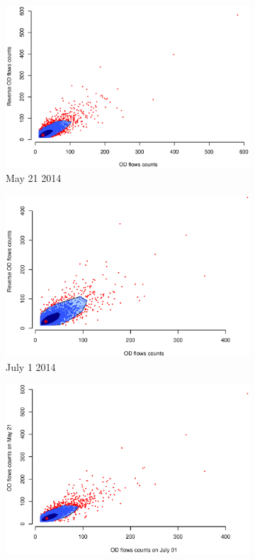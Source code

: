 \documentclass[a4paper,UKenglish]{lipics-v2016}
\begin{document}
\begin{figure}
	\centering
	\begin{subfigure}[b]{0.49\textwidth}
		\includegraphics[width=\textwidth]{images/OD_0521.eps}
		\caption{May 21 2014}
		\label{fig:OD_0521}
	\end{subfigure}
	\hfill %
	\begin{subfigure}[b]{0.49\textwidth}
		\includegraphics[width=\textwidth]{images/OD_0701.eps}
		\caption{July 1 2014}
		\label{fig:OD_0721}
	\end{subfigure}
    \hfill
	\begin{subfigure}[b]{0.49\textwidth}
	\includegraphics[width=\textwidth]{images/OD_0701_0521.eps}

\end{subfigure}
\end{figure}
\end{document}
